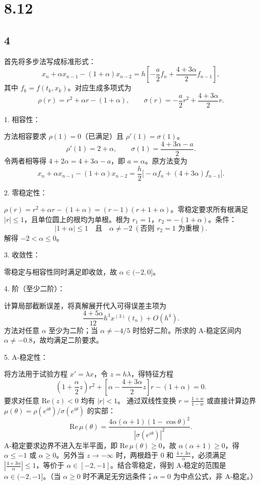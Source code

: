 \documentclass{article}
\begin{document}
\section*{8.12}
\subsection*{4}


首先将多步法写成标准形式：
\[
x_n + \alpha x_{n-1} - (1+\alpha)x_{n-2} = h\!\left[-\frac{a}{2}f_n + \frac{4+3\alpha}{2}f_{n-1}\right],
\]
其中 \(f_k = f(t_k, x_k)\)。对应生成多项式为
\[
\rho(r) = r^2 + \alpha r - (1+\alpha),\qquad
\sigma(r) = -\frac{a}{2}r^2 + \frac{4+3\alpha}{2}r.
\]

1. 相容性：

方法相容要求 \(\rho(1)=0\)（已满足）且 \(\rho'(1)=\sigma(1)\)。
\[
\rho'(1) = 2+\alpha,\qquad \sigma(1) = \frac{4+3\alpha - a}{2}.
\]
令两者相等得 \(4+2\alpha = 4+3\alpha - a\)，即 \(a = \alpha\)。原方法变为
\[
x_n + \alpha x_{n-1} - (1+\alpha)x_{n-2} = \frac{h}{2}\bigl[-\alpha f_n + (4+3\alpha)f_{n-1}\bigr].
\]

2. 零稳定性：

\(\rho(r) = r^2 + \alpha r - (1+\alpha) = (r-1)(r+1+\alpha)\)。零稳定要求所有根满足 \(|r|\le 1\)，且单位圆上的根均为单根。根为 \(r_1=1\)，\(r_2=-(1+\alpha)\)。条件：
\[
|1+\alpha| \le 1 \quad\text{且}\quad \alpha \neq -2\; (\text{否则 }r_2=1\text{ 为重根}).
\]
解得 \(-2 < \alpha \le 0\)。

3. 收敛性：

零稳定与相容性同时满足即收敛，故 \(\alpha\in(-2,0]\)。

4. 阶（至少二阶）：

计算局部截断误差，将真解展开代入可得误差主项为
\[
\frac{4+5\alpha}{12}h^3 x^{(3)}(t_n) + O(h^4).
\]
方法对任意 \(\alpha\) 至少为二阶；当 \(\alpha \neq -4/5\) 时恰好二阶。所求的 A-稳定区间内 \(\alpha \neq -0.8\)，故均满足二阶要求。

5. A-稳定性：

将方法用于试验方程 \(x' = \lambda x\)，令 \(z = h\lambda\)，得特征方程
\[
\left(1 + \frac{\alpha}{2}z\right)r^2 + \left[\alpha - \frac{4+3\alpha}{2}z\right]r - (1+\alpha) = 0.
\]
要求对任意 \(\mathrm{Re}(z)<0\) 均有 \(|r|<1\)。
通过双线性变换 \(r = \frac{1+w}{1-w}\) 或直接计算边界 \(\mu(\theta) = \rho(e^{i\theta})/\sigma(e^{i\theta})\) 的实部：
\[
\mathrm{Re}\,\mu(\theta) = \frac{4\alpha(\alpha+1)(1-\cos\theta)^2}{|\sigma(e^{i\theta})|^2}.
\]
A-稳定要求边界不进入左半平面，即 \(\mathrm{Re}\,\mu(\theta) \ge 0\)，故 \(\alpha(\alpha+1) \ge 0\)，得 \(\alpha \le -1\) 或 \(\alpha \ge 0\)。另外当 \(z\to -\infty\) 时，两根趋于 \(0\) 和 \(\frac{4+3\alpha}{\alpha}\)，必须满足 \(\left|\frac{4+3\alpha}{\alpha}\right| \le 1\)，等价于 \(\alpha \in [-2,-1]\)。结合零稳定，得到 A-稳定的范围是 \(\alpha \in (-2,-1]\)。（当 \(\alpha \ge 0\) 时不满足无穷远条件；\(\alpha=0\) 为中点公式，非 A-稳定。）
\end{document}
